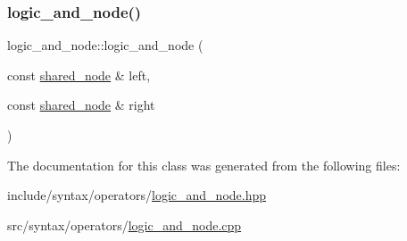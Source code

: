 \subsubsection{\texorpdfstring{logic\+\_\+and\+\_\+node()}{logic\_and\_node()}}
{\footnotesize\ttfamily logic\+\_\+and\+\_\+node\+::logic\+\_\+and\+\_\+node (\begin{DoxyParamCaption}\item[{const \hyperlink{namespacejawe_a3f307481d921b6cbb50cc8511fc2b544}{shared\+\_\+node} \&}]{left,  }\item[{const \hyperlink{namespacejawe_a3f307481d921b6cbb50cc8511fc2b544}{shared\+\_\+node} \&}]{right }\end{DoxyParamCaption})}



The documentation for this class was generated from the following files\+:\begin{DoxyCompactItemize}
\item 
include/syntax/operators/\hyperlink{logic__and__node_8hpp}{logic\+\_\+and\+\_\+node.\+hpp}\item 
src/syntax/operators/\hyperlink{logic__and__node_8cpp}{logic\+\_\+and\+\_\+node.\+cpp}\end{DoxyCompactItemize}
